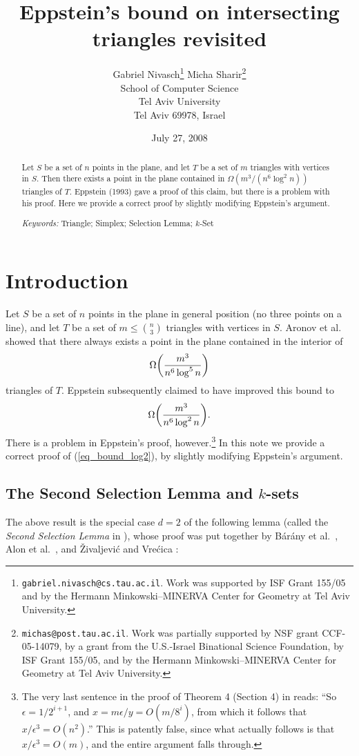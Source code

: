 \documentclass[11pt]{article}
\author{Gabriel Nivasch\thanks{\texttt{gabriel.nivasch@cs.tau.ac.il}.
Work was supported by ISF Grant 155/05 and by the Hermann
Minkowski--MINERVA Center for Geometry at Tel Aviv University.}
\quad Micha Sharir\thanks{\texttt{michas@post.tau.ac.il}. Work was
partially supported by NSF grant CCF-05-14079, by a grant from the
U.S.-Israel Binational Science Foundation, by ISF Grant 155/05, and
by the Hermann Minkowski--MINERVA Center for Geometry
at Tel Aviv University.}\\
\footnotesize School of Computer Science\\[-1mm]
\footnotesize Tel Aviv University\\[-1mm]
\footnotesize Tel Aviv 69978, Israel}
\date{July 27, 2008}
\title{Eppstein's bound on intersecting triangles revisited}
\begin{document}
\maketitle

\begin{abstract}
Let $S$ be a set of $n$ points in the plane, and let $T$ be a set of
$m$ triangles with vertices in $S$. Then there exists a point in the
plane contained in $\Omega(m^3/(n^6\log^2 n))$ triangles of $T$.
Eppstein (1993) gave a proof of this claim, but there is a problem
with his proof. Here we provide a correct proof by slightly
modifying Eppstein's argument.

\emph{Keywords:} Triangle; Simplex; Selection Lemma; $k$-Set
\end{abstract}

\section{Introduction}

Let $S$ be a set of $n$ points in the plane in general position (no
three points on a line), and let $T$ be a set of $m \le {n\choose
3}$ triangles with vertices in $S$. Aronov et al.~\cite{ACEGSW}
showed that there always exists a point in the plane contained in
the interior of
\begin{equation}\label{eq_bound_log5}
\Omega{\left({ m^3 \over n^6\log^5 n }\right)}
\end{equation}
triangles of $T$. Eppstein \cite{eppstein} subsequently claimed to
have improved this bound to
\begin{equation}\label{eq_bound_log2}
\Omega{\left({ m^3 \over n^6\log^2 n }\right)}.
\end{equation}
There is a problem in Eppstein's proof, however.\footnote{The very
last sentence in the proof of Theorem 4 (Section 4) in
\cite{eppstein} reads: ``So $\epsilon = 1/2^{i+1}$, and $x =
m\epsilon/y = O(m/8^i)$, from which it follows that $x/\epsilon^3 =
O(n^2)$.'' This is patently false, since what actually follows is
that $x/\epsilon^3 = O(m)$, and the entire argument falls through.}
In this note we provide a correct proof of (\ref{eq_bound_log2}), by
slightly modifying Eppstein's argument.

\subsection{The Second Selection Lemma and $k$-sets}

The above result is the special case $d=2$ of the following lemma
(called the \emph{Second Selection Lemma} in \cite{matou}), whose
proof was put together by B\'ar\'any et al.~\cite{BFL}, Alon et
al.~\cite{ABFK}, and \v Zivaljevi\'c and Vre\'cica \cite{ZV}:
\end{document}
